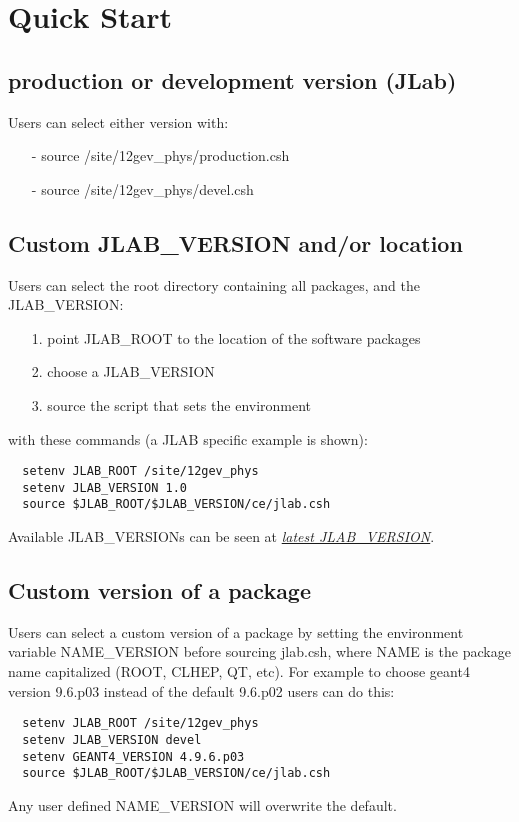 \section{Quick Start}

\subsection{production or development version (JLab)}
Users can select either version with:
\begin{itemize}
\item[-] source /site/12gev\_phys/production.csh
\item[-] source /site/12gev\_phys/devel.csh
\end{itemize}
\subsection{Custom JLAB\_VERSION and/or location}
Users can select the root directory containing all packages, and the JLAB\_VERSION:
\begin{itemize}
\item[1.] point JLAB\_ROOT to the location of the software packages
\item[2.] choose a JLAB\_VERSION
\item[3.] source the script that sets the environment
\end{itemize}
with these commands (a JLAB specific example is shown):

\begin{verbatim}
  setenv JLAB_ROOT /site/12gev_phys
  setenv JLAB_VERSION 1.0
  source $JLAB_ROOT/$JLAB_VERSION/ce/jlab.csh
\end{verbatim}
Available JLAB\_VERSIONs can be seen at 
\href{https://gemc.jlab.org/gemc/Documentation/Entries/2014/2/27_jlab_versions.html}{\it latest JLAB\_VERSION}.

\subsection{Custom version of a package}
Users can select a custom version of a package by setting the 
environment variable NAME\_VERSION before sourcing jlab.csh, where NAME is the package name capitalized (ROOT, CLHEP, QT, etc). 
For example to choose geant4 version 9.6.p03 instead of the default 9.6.p02 users can do this:
\begin{verbatim}
  setenv JLAB_ROOT /site/12gev_phys
  setenv JLAB_VERSION devel
  setenv GEANT4_VERSION 4.9.6.p03
  source $JLAB_ROOT/$JLAB_VERSION/ce/jlab.csh
\end{verbatim}
Any user defined NAME\_VERSION will overwrite the default. 

